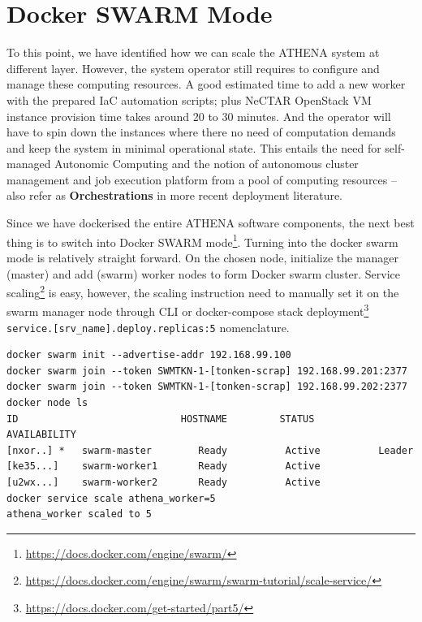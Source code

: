 \section{Docker SWARM Mode}

To this point, we have identified how we can scale the ATHENA system at different layer. However, the system operator still requires to configure and manage these computing resources. A good estimated time to add a new worker with the prepared IaC automation scripts; plus NeCTAR OpenStack VM instance provision time takes around 20 to 30 minutes. And the operator will have to spin down the instances where there no need of computation demands and keep the system in minimal operational state. This entails the need for self-managed Autonomic Computing \parencite{1160055} and the notion of autonomous cluster management and job execution platform from a pool of computing resources -- also refer as \textbf{Orchestrations} in more recent deployment literature.

Since we have dockerised the entire ATHENA software components, the next best thing is to switch into Docker SWARM mode\footnote{\url{https://docs.docker.com/engine/swarm/}}. Turning into the docker swarm mode is relatively straight forward. On the chosen node, initialize the manager (master) and add (swarm) worker nodes to form Docker swarm cluster. Service scaling\footnote{\url{https://docs.docker.com/engine/swarm/swarm-tutorial/scale-service/}} is easy, however, the scaling instruction need to manually set it on the swarm manager node through CLI or docker-compose stack deployment\footnote{\url{https://docs.docker.com/get-started/part5/}}  \verb|service.[srv_name].deploy.replicas:5| nomenclature.
\begin{small}
\begin{verbatim}
docker swarm init --advertise-addr 192.168.99.100
docker swarm join --token SWMTKN-1-[tonken-scrap] 192.168.99.201:2377
docker swarm join --token SWMTKN-1-[tonken-scrap] 192.168.99.202:2377
docker node ls
ID                            HOSTNAME         STATUS          AVAILABILITY
[nxor..] *   swarm-master        Ready          Active          Leader
[ke35...]    swarm-worker1       Ready          Active
[u2wx...]    swarm-worker2       Ready          Active
docker service scale athena_worker=5
athena_worker scaled to 5
\end{verbatim}
\end{small}

